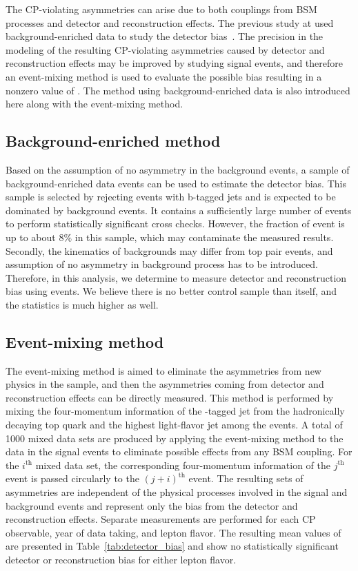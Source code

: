 The CP-violating asymmetries can arise due to both couplings from BSM processes and detector and reconstruction effects.
The previous study at \oldTeV used background-enriched data to study the detector bias~\cite{CPVtop:CMSresult}.
The precision in the modeling of the resulting CP-violating asymmetries caused by detector and reconstruction effects may be improved by studying signal events, and therefore an event-mixing method is used to evaluate the possible bias resulting in a nonzero value of \Acpprime.
The method using background-enriched data is also introduced here along with the event-mixing method.

\subsection{Background-enriched method}
Based on the assumption of no asymmetry in the background events, a sample of background-enriched data events can be used to estimate the detector bias.
This sample is selected by rejecting events with b-tagged jets and is expected to be dominated by background events.
It contains a sufficiently large number of events to perform statistically significant cross checks.
However, the fraction of \ttbar event is up to about $8\%$ in this sample, which may contaminate the measured results.
Secondly, the kinematics of backgrounds may differ from top pair events, and assumption of no asymmetry in background process has to be introduced.
Therefore, in this analysis, we determine to measure detector and reconstruction bias using \ttbar events.
We believe there is no better control sample than \ttbar itself, and the statistics is much higher as well.

\subsection{Event-mixing method}
The event-mixing method is aimed to eliminate the asymmetries from new physics in the sample, and then the asymmetries coming from detector and reconstruction effects can be directly measured. 
This method is performed by mixing the four-momentum information of the \PQb-tagged jet from the hadronically decaying top quark and the highest \PT light-flavor jet among the events.
A total of 1000 mixed data sets are produced by applying the event-mixing method to the data in the signal events to eliminate possible effects from any BSM coupling.
For the $i^{\text{th}}$ mixed data set, the corresponding four-momentum information of the $j^{\text{th}}$ event is passed circularly to the $(j+i)^{\text{th}}$ event.
The resulting sets of asymmetries are independent of the physical processes involved in the signal and background events and represent only the bias from the detector and reconstruction effects.
Separate measurements are performed for each CP observable, year of data taking, and lepton flavor.
The resulting mean values of \Acpprime are presented in Table~\ref{tab:detector_bias} and show no statistically significant detector or reconstruction bias for either lepton flavor.

